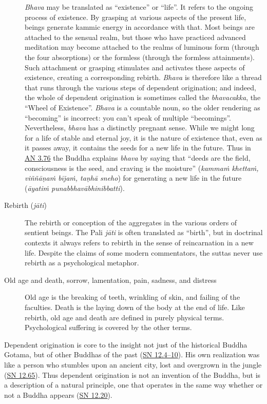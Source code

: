 \documentclass[12pt,openany]{book}%
\begin{document}
\begin{description}
\textit{Bhava} may be translated as “existence” or “life”. It refers to the ongoing process of existence. By grasping at various aspects of the present life, beings generate kammic energy in accordance with that. Most beings are attached to the sensual realm, but those who have practiced advanced meditation may become attached to the realms of luminous form (through the four absorptions) or the formless (through the formless attainments). Such attachment or grasping stimulates and activates these aspects of existence, creating a corresponding rebirth. \textit{Bhava} is therefore like a thread that runs through the various steps of dependent origination; and indeed, the whole of dependent origination is sometimes called the \textit{bhavacakka}, the “Wheel of Existence”. \textit{Bhava} is a countable noun, so the older rendering as “becoming” is incorrect: you can’t speak of multiple “becomings”. Nevertheless, \textit{bhava} has a distinctly pregnant sense. While we might long for a life of stable and eternal joy, it is the nature of existence that, even as it passes away, it contains the seeds for a new life in the future. Thus in \href{https://suttacentral.net/an3.76}{AN 3.76} the Buddha explains \textit{bhava} by saying that “deeds are the field, consciousness is the seed, and craving is the moisture” (\textit{\textsanskrit{kammaṁ} \textsanskrit{khettaṁ}, \textsanskrit{viññāṇaṁ} \textsanskrit{bījaṁ}, \textsanskrit{taṇhā} sneho}) for generating a new life in the future (\textit{\textsanskrit{āyatiṁ} \textsanskrit{punabbhavābhinibbatti}}).%
\item[Rebirth (\textit{\textsanskrit{jāti}})] The rebirth or conception of the aggregates in the various orders of sentient beings.
The Pali \textit{\textsanskrit{jāti}} is often translated as “birth”, but in doctrinal contexts it always refers to rebirth in the sense of reincarnation in a new life. Despite the claims of some modern commentators, the suttas never use rebirth as a psychological metaphor.%
\item[Old age and death, sorrow, lamentation, pain, sadness, and distress] Old age is the breaking of teeth, wrinkling of skin, and failing of the faculties. Death is the laying down of the body at the end of life.
Like rebirth, old age and death are defined in purely physical terms. Psychological suffering is covered by the other terms.%
\end{description}

Dependent origination is core to the insight not just of the historical Buddha Gotama, but of other Buddhas of the past (\href{https://suttacentral.net/sn12.4}{SN 12.4–10}). His own realization was like a person who stumbles upon an ancient city, lost and overgrown in the jungle (\href{https://suttacentral.net/sn12.65}{SN 12.65}). Thus dependent origination is not an invention of the Buddha, but is a description of a natural principle, one that operates in the same way whether or not a Buddha appears (\href{https://suttacentral.net/sn12.20}{SN 12.20}).
\end{document}
